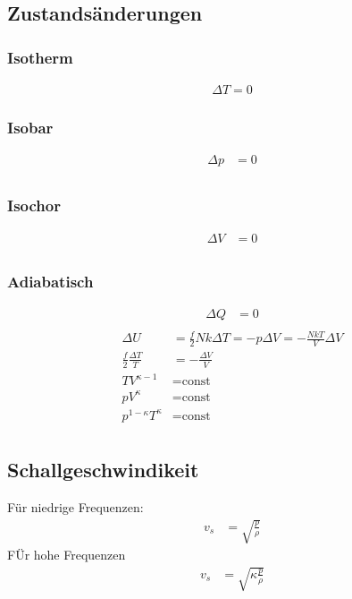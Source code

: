 \documentclass[11pt,letterpaper]{article}
\begin{document}
\subsection{Zustandsänderungen}
{
    \subsubsection{Isotherm}
    {
        \begin{align*}
            \Delta T = 0
        \end{align*}
    }
    \subsubsection{Isobar}
    {
        \begin{align*}
            \Delta p &= 0\\
        \end{align*}
    }
    \subsubsection{Isochor}
    {
        \begin{align*}
            \Delta V &= 0 \\
        \end{align*}
    }
    \subsubsection{Adiabatisch}
    {
        \begin{align*}
            \Delta Q &= 0\\
        \end{align*}
        \begin{align*}
            \Delta U &= \frac{f}{2} N k \Delta T = -p \Delta V = -\frac{N k T }{V} \Delta V\\
            \frac{f}{2} \frac{\Delta T}{T} &= - \frac{\Delta V }{V}\\
             T V ^{\kappa -1} &=  \text{const}\\
            p V ^{\kappa } &=  \text{const}\\
            p^{1-\kappa} T ^{\kappa} &=  \text{const}\\
        \end{align*}
    }
}

\subsection{Schallgeschwindikeit}
{
    Für niedrige Frequenzen:
    \begin{align*}
        v_s &= \sqrt{\frac{p}{\rho}}
    \end{align*}
    FÜr hohe Frequenzen
    \begin{align*}
        v_s &= \sqrt{\kappa \frac{p}{\rho}}
    \end{align*}
}
\end{document}
